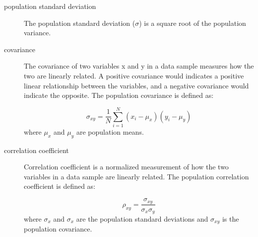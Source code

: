 \begin{description}
  \item [population standard deviation]
	The population standard deviation ($\sigma$) is a square root of the population variance.
  \item [covariance]
	The covariance of two variables x and y in a data sample measures how the two are linearly related.
	A positive covariance would indicates a positive linear relationship between the variables, and a negative covariance would indicate the opposite. 
	The population covariance is defined as:

	\begin{equation}
			\sigma_{xy} = \frac{1}{N} \sum_{i=1}^{N}{(x_{i} - \mu_{x})(y_{i} - \mu_{y})} 
		      \end{equation}
	where $\mu_{x}$ and $\mu_{y}$ are population means.

  \item [correlation coefficient]
	Correlation coefficient is a normalized measurement of how the two variables in a data sample are linearly related.
	The population correlation coefficient is defined as:

	\begin{equation}
	  \rho_{xy} = \frac{\sigma_{xy}}{\sigma_{x} \sigma_{y}}
	\end{equation}
	where $\sigma_{x}$ and $\sigma_{x}$ are the population standard deviations and $\sigma_{xy}$ is the population covariance.
	
  
\end{description}
















